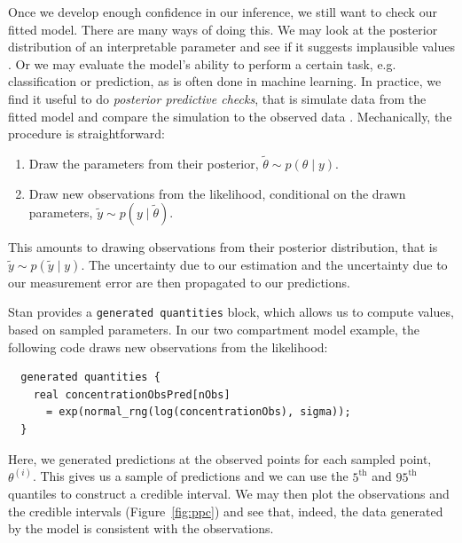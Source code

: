 Once we develop enough confidence in our inference, we still want to check our fitted model.
There are many ways of doing this.
We may look at the posterior distribution of an interpretable parameter and see if it suggests implausible values \cite[e.g][]{Gelman:1996}.
Or we may evaluate the model's ability to perform a certain task, e.g. classification or prediction, as is often done in machine learning.
In practice, we find it useful to do \textit{posterior predictive checks}, that is simulate data from the fitted model and compare the simulation to the observed data \cite[chapter 6]{Gelman:2013}.
%
Mechanically, the procedure is straightforward:
\begin{enumerate}
  \item Draw the parameters from their posterior, $\tilde \theta \sim p(\theta \mid y).$
  \item Draw new observations from the likelihood, conditional on the drawn parameters, $\tilde y \sim p(y \mid \tilde \theta)$.
\end{enumerate}
This amounts to drawing observations from their posterior distribution, that is $\tilde y \sim p(\tilde y \mid y)$.
The uncertainty due to our estimation and the uncertainty due to our measurement error are then propagated to our predictions.

Stan provides a \texttt{generated quantities} block, which allows us to compute values, based on sampled parameters.
In our two compartment model example, the following code draws new observations from the likelihood:
\begin{lstlisting}
  generated quantities {
    real concentrationObsPred[nObs] 
      = exp(normal_rng(log(concentrationObs), sigma));
  }
\end{lstlisting}
%
Here, we generated predictions at the observed points for each sampled point, $\theta^{(i)}$.
This gives us a sample of predictions and we can use the $5^\mathrm{th}$ and $95^\mathrm{th}$ quantiles to construct a credible interval.
We may then plot the observations and the credible intervals (Figure~\ref{fig:ppc}) and see that, indeed, the data generated by the model is consistent with the observations.
 

